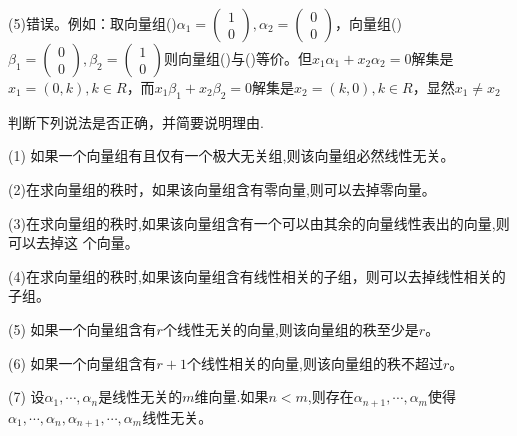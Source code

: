 \documentclass[a4paper]{report}
\begin{document}
\begin{jie}
(5)错误。例如：取向量组(\uppercase\expandafter{})$\alpha_1=
\begin{pmatrix}
1\\ 0
\end{pmatrix}
,\alpha_2=
\begin{pmatrix}
0 \\0
\end{pmatrix}$，向量组(\uppercase\expandafter{})$\beta_1=
\begin{pmatrix}
0\\ 0
\end{pmatrix}
,\beta_2=
\begin{pmatrix}
1 \\0
\end{pmatrix}$则向量组(\uppercase\expandafter{})与(\uppercase\expandafter{})等价。但$x_1\alpha_1+x_2\alpha_2=0$解集是$x_1=(0,k),k\in R$，而$x_1\beta_1+x_2\beta_2=0$解集是$x_2=(k,0),k\in R$，显然$x_1\neq x_2$
\end{jie}

\EX 判断下列说法是否正确，并简要说明理由.

(1) 如果一个向量组有且仅有一个极大无关组,则该向量组必然线性无关。

(2)在求向量组的秩时，如果该向量组含有零向量,则可以去掉零向量。

(3)在求向量组的秩时,如果该向量组含有一个可以由其余的向量线性表出的向量,则可以去掉这
个向量。

(4)在求向量组的秩时,如果该向量组含有线性相关的子组，则可以去掉线性相关的子组。

(5) 如果一个向量组含有$r$个线性无关的向量,则该向量组的秩至少是$r$。

(6) 如果一个向量组含有$r+1$个线性相关的向量,则该向量组的秩不超过$r$。

(7) 设$\alpha_1,\cdots,\alpha_n$是线性无关的$m$维向量.如果$n< m$,则存在$\alpha_{n+1},\cdots,\alpha_{m}$使得$\alpha_1,\cdots,\alpha_n,\alpha_{n+1},\cdots,\alpha_{m}$线性无关。
\end{document}
